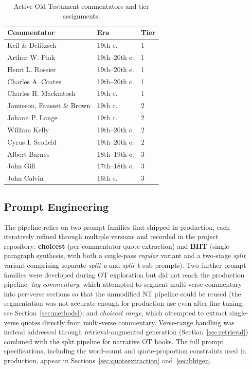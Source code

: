\begin{table}[htbp]
\centering
\small
\caption{Active Old Testament commentators and tier assignments.}
\label{tab:ot-commentators}
\begin{tabular}{@{}lll@{}}
\toprule
\textbf{Commentator} & \textbf{Era} & \textbf{Tier} \\
\midrule
Keil \& Delitzsch & 19th c. & 1 \\
Arthur W. Pink & 19th--20th c. & 1 \\
Henri L. Rossier & 19th--20th c. & 1 \\
Charles A. Coates & 19th--20th c. & 1 \\
Charles H. Mackintosh & 19th c. & 1 \\
Jamieson, Fausset \& Brown & 19th c. & 2 \\
Johann P. Lange & 19th c. & 2 \\
William Kelly & 19th--20th c. & 2 \\
Cyrus I. Scofield & 19th--20th c. & 2 \\
Albert Barnes & 18th--19th c. & 3 \\
John Gill & 17th--18th c. & 3 \\
John Calvin & 16th c. & 3 \\
\bottomrule
\end{tabular}
\end{table}

\subsection{Prompt Engineering}

The pipeline relies on two prompt families that shipped in production, each iteratively refined through multiple versions and recorded in the project repository: \textbf{choicest} (per-commentator quote extraction) and \textbf{BHT} (single-paragraph synthesis, with both a single-pass \emph{regular} variant and a two-stage \emph{split} variant comprising separate \emph{split-a} and \emph{split-b} sub-prompts). Two further prompt families were developed during OT exploration but did not reach the production pipeline: \emph{tag commentary}, which attempted to segment multi-verse commentary into per-verse sections so that the unmodified NT pipeline could be reused (the segmentation was not accurate enough for production use even after fine-tuning; see Section~\ref{sec:methods}); and \emph{choicest range}, which attempted to extract single-verse quotes directly from multi-verse commentary. Verse-range handling was instead addressed through retrieval-augmented generation (Section~\ref{sec:retrieval}) combined with the split pipeline for narrative OT books. The full prompt specifications, including the word-count and quote-proportion constraints used in production, appear in Sections~\ref{sec:quoteextraction} and~\ref{sec:bhtgen}.

